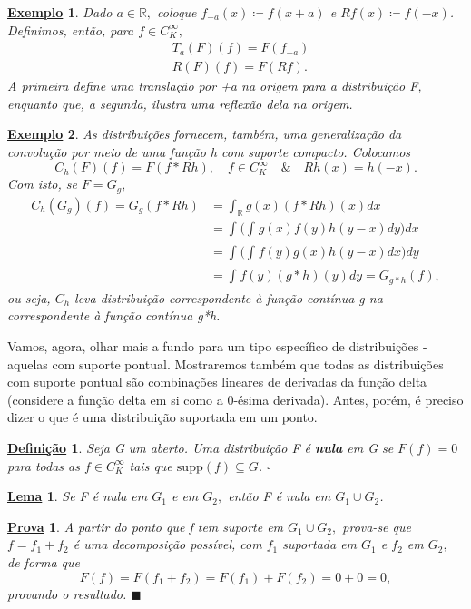 \documentclass{article}
\newtheorem*{def*}{\underline{Defini\c c\~ao}}
\newtheorem*{lemma*}{\underline{Lema}}
\newtheorem{example}{\underline{Exemplo}}
\newtheorem*{proof*}{\underline{Prova}}
\renewcommand\qedsymbol{$\blacksquare$}
\begin{document}
 \begin{example}
   Dado \(a\in \mathbb{R},\) coloque \(f_{-a}(x)\coloneqq f(x+a)\) e \(Rf(x)\coloneqq f(-x)\). Definimos, então, para \(f\in C_{K}^{\infty},\)
  \begin{align*}
    &T_{a}(F)(f) = F(f_{-a})\\ 
    &R(F)(f) = F(Rf).
  \end{align*}
  A primeira define uma translação por +a na origem para a distribuição F, enquanto que, a segunda, ilustra uma reflexão dela na origem. 
 \end{example}
\begin{example}
  As distribuições fornecem, também, uma generalização da convolução por meio de uma função h com suporte compacto. Colocamos 
    \[
      C_{h}(F)(f) = F(f*Rh),\quad f\in C_{K}^{\infty}\quad\&\quad Rh(x) = h(-x).
    \]
  Com isto, se \(F = G_{g},\) 
 \begin{align*}
   C_{h}(G_{g})(f) = G_{g}(f*Rh) &=\int_{\mathbb{R}}^{}g(x)(f*Rh)(x)dx \\ 
                                 &= \int_{}^{}\biggl(\int_{}^{}g(x)f(y)h(y-x)dy\biggr)dx \\
                                 &= \int_{}^{}\biggl(\int_{}^{}f(y)g(x)h(y-x)dx\biggr)dy \\ 
                                 &= \int_{}^{}f(y)(g*h)(y)dy = G_{g*h}(f),
 \end{align*}
 ou seja, \(C_{h}\) leva distribuição correspondente à função contínua g na correspondente à função contínua g*h.
\end{example}
  Vamos, agora, olhar mais a fundo para um tipo específico de distribuições - aquelas com suporte pontual. Mostraremos também que todas as distribuições com suporte pontual são combinações lineares 
de derivadas da função delta (considere a função delta em si como a 0-ésima derivada). Antes, porém, é preciso dizer o que é uma distribuição suportada em um ponto. 
 \begin{def*}
   Seja G um aberto. Uma distribuição F é \textbf{nula} em G se \(F(f) = 0\) para todas as \(f\in C_{K}^{\infty}\) tais que \(\mathrm{supp}(f)\subseteq G\). \(\square\)
 \end{def*}
\begin{lemma*}
  Se F é nula em \(G_{1}\) e em \(G_{2},\) então F é nula em \(G_1\cup G_2\).
\end{lemma*}
 \begin{proof*}
   A partir do ponto que f tem suporte em \(G_{1}\cup G_{2},\) prova-se que \(f = f_{1} + f_{2}\) é uma decomposição possível, com \(f_{1}\) suportada em \(G_{1}\) e \(f_{2}\) em \(G_{2},\) de forma que 
     \[
       F(f) = F(f_{1} + f_{2}) = F(f_{1}) + F(f_{2}) = 0 + 0 = 0,
     \]
  provando o resultado. \qedsymbol
 \end{proof*}
\end{document}
